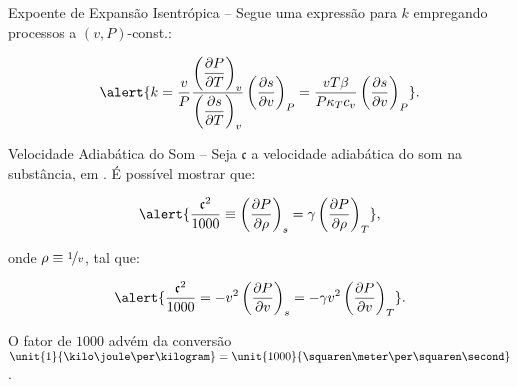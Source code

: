 \begin{frame}[allowframebreaks]{Expoente de Expansão Isentrópica --}
        \pagebreak
        Segue uma expressão para \alert{$k$} empregando processos a \alert{$(v, P)$-const.}:

        \begin{equation*}
            \alert{
                k =
                    \frac{v}{P}
                    \frac{
                        \left(\dfrac{\partial P}{\partial T}\right)_{v}
                    }{
                        \left(\dfrac{\partial s}{\partial T}\right)_{v}
                    }
                    \left(\frac{\partial s}{\partial v}\right)_{P} =
                    \frac{vT\beta}{P\kappa_Tc_v}
                    \left(\frac{\partial s}{\partial v}\right)_{P}
            }.
        \end{equation*}

    \end{frame}

    \begin{frame}[allowframebreaks]{Velocidade Adiabática do Som --}\vspace*{-0em}
        Seja \alert{$\mathfrak{c}$} a \alert{velocidade adiabática do som} na substância, em
        \alert{\meter\per\second}. É possível mostrar que:

        \begin{equation*}
            \alert{
                \frac{\mathfrak{c}^2}{1000} \equiv
                \left(\frac{\partial P}{\partial\rho}\right)_s =
                \gamma\left(\frac{\partial P}{\partial\rho}\right)_T
            },
        \end{equation*}\vspace*\medskipamount

        \noindent onde \alert{$\rho \equiv \nicefrac{1}{v}$}, tal que:

        \begin{equation*}
            \alert{
                \frac{\mathfrak{c}^2}{1000} =
                -v^2 \left(\frac{\partial P}{\partial v}\right)_s =
                -\gamma v^2 \left(\frac{\partial P}{\partial v}\right)_T
            }.
        \end{equation*}\vspace*\medskipamount

        O fator de \alert{$1000$} advém da conversão \alert{$\unit{1}{\kilo\joule\per\kilogram}
        = \unit{1000}{\squaren\meter\per\squaren\second}$}.

    \end{frame}

